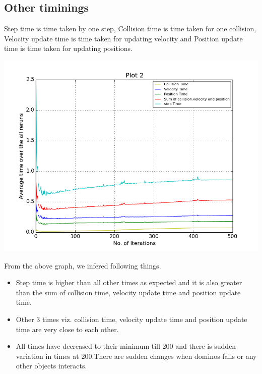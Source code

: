 \documentclass[11pt]{article}
\begin{document}
\subsection{Other timinings}
Step time is time taken by one step, Collision time is time taken for one collision, Velocity update time is time taken for updating velocity and Position update time is time taken for updating positions.
\begin{center}
\includegraphics[scale=0.5]{g12_plot02}
\end{center}
From the above graph, we infered following things.
\begin{itemize}
\item Step time is higher than all other times as expected and it is also greater than the sum of collision time, velocity update time and position update time.
\item Other 3 times viz. collision time, velocity update time and position update time are very close to each other.
\item All times have decreased to their minimum till 200 and there is sudden variation in times at 200.There are sudden changes when dominos falls or any other objects interacts.
\end{itemize}
\end{document}
